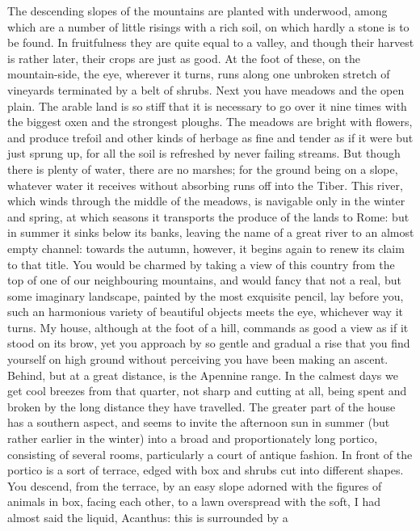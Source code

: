 The descending slopes of the mountains are planted with underwood, among
which are a number of little risings with a rich soil, on which hardly a
stone is to be found. In fruitfulness they are quite equal to a valley,
and though their harvest is rather later, their crops are just as good. At
the foot of these, on the mountain-side, the eye, wherever it turns, runs
along one unbroken stretch of vineyards terminated by a belt of shrubs.
Next you have meadows and the open plain. The arable land is so stiff that
it is necessary to go over it nine times with the biggest oxen and the
strongest ploughs. The meadows are bright with flowers, and produce
trefoil and other kinds of herbage as fine and tender as if it were but
just sprung up, for all the soil is refreshed by never failing streams.
But though there is plenty of water, there are no marshes; for the ground
being on a slope, whatever water it receives without absorbing runs off
into the Tiber. This river, which winds through the middle of the meadows,
is navigable only in the winter and spring, at which seasons it transports
the produce of the lands to Rome: but in summer it sinks below its banks,
leaving the name of a great river to an almost empty channel: towards the
autumn, however, it begins again to renew its claim to that title. You
would be charmed by taking a view of this country from the top of one of
our neighbouring mountains, and would fancy that not a real, but some
imaginary landscape, painted by the most exquisite pencil, lay before you,
such an harmonious variety of beautiful objects meets the eye, whichever
way it turns. My house, although at the foot of a hill, commands as good a
view as if it stood on its brow, yet you approach by so gentle and gradual
a rise that you find yourself on high ground without perceiving you have
been making an ascent. Behind, but at a great distance, is the Apennine
range. In the calmest days we get cool breezes from that quarter, not
sharp and cutting at all, being spent and broken by the long distance they
have travelled. The greater part of the house has a southern aspect, and
seems to invite the afternoon sun in summer (but rather earlier in the
winter) into a broad and proportionately long portico, consisting of
several rooms, particularly a court of antique fashion. In front of the
portico is a sort of terrace, edged with box and shrubs cut into different
shapes. You descend, from the terrace, by an easy slope adorned with the
figures of animals in box, facing each other, to a lawn overspread with
the soft, I had almost said the liquid, Acanthus: this is surrounded by a
